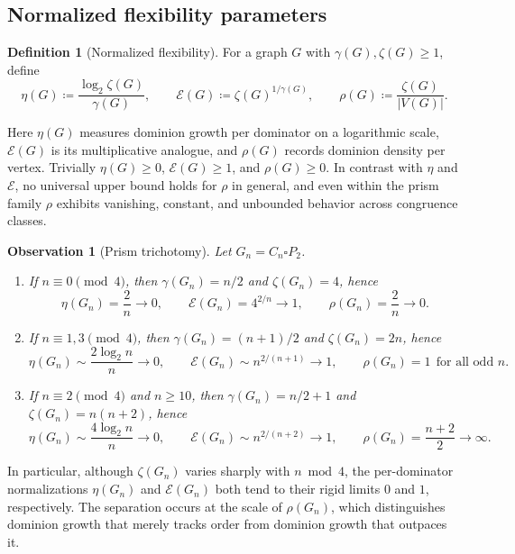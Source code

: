 \documentclass[11pt]{article}
\theoremstyle{plain}
\newtheorem{observation}[theorem]{Observation}
\theoremstyle{definition}
\newtheorem{definition}[theorem]{Definition}
\theoremstyle{remark}
\begin{document}
\subsection{Normalized flexibility parameters}

\begin{definition}[Normalized flexibility]\label{def:flex-params}
For a graph $G$ with $\gamma(G),\zeta(G)\ge 1$, define
\[
\eta(G)\coloneqq \frac{\log_2 \zeta(G)}{\gamma(G)},
\qquad
\mathcal{E}(G)\coloneqq \zeta(G)^{1/\gamma(G)},
\qquad
\rho(G)\coloneqq \frac{\zeta(G)}{|V(G)|}.
\]
\end{definition}

Here $\eta(G)$ measures dominion growth per dominator on a logarithmic scale, $\mathcal{E}(G)$
is its multiplicative analogue, and $\rho(G)$ records dominion density per vertex.  Trivially
$\eta(G)\ge 0$, $\mathcal{E}(G)\ge 1$, and $\rho(G)\ge 0$.  In contrast with $\eta$ and
$\mathcal{E}$, no universal upper bound holds for $\rho$ in general, and even within the prism
family $\rho$ exhibits vanishing, constant, and unbounded behavior across congruence classes.

\begin{observation}[Prism trichotomy]\label{obs:flexibility-trichotomy}
Let $G_n=C_n\square P_2$.
\begin{enumerate}[label=\textup{(\roman*)},leftmargin=*,itemsep=2pt]
\item If $n\equiv 0\pmod4$, then $\gamma(G_n)=n/2$ and $\zeta(G_n)=4$, hence
\[
\eta(G_n)=\frac{2}{n}\to 0,\qquad
\mathcal{E}(G_n)=4^{2/n}\to 1,\qquad
\rho(G_n)=\frac{2}{n}\to 0.
\]
\item If $n\equiv 1,3\pmod4$, then $\gamma(G_n)=(n+1)/2$ and $\zeta(G_n)=2n$, hence
\[
\eta(G_n)\sim \frac{2\log_2 n}{n}\to 0,\qquad
\mathcal{E}(G_n)\sim n^{2/(n+1)}\to 1,\qquad
\rho(G_n)=1\ \ \text{for all odd }n.
\]
\item If $n\equiv 2\pmod4$ and $n\ge 10$, then $\gamma(G_n)=n/2+1$ and $\zeta(G_n)=n(n+2)$, hence
\[
\eta(G_n)\sim \frac{4\log_2 n}{n}\to 0,\qquad
\mathcal{E}(G_n)\sim n^{2/(n+2)}\to 1,\qquad
\rho(G_n)=\frac{n+2}{2}\to \infty.
\]
\end{enumerate}
\end{observation}

In particular, although $\zeta(G_n)$ varies sharply with $n\bmod 4$, the per-dominator
normalizations $\eta(G_n)$ and $\mathcal{E}(G_n)$ both tend to their rigid limits $0$ and $1$,
respectively.  The separation occurs at the scale of $\rho(G_n)$, which distinguishes dominion
growth that merely tracks order from dominion growth that outpaces it.
\end{document}
